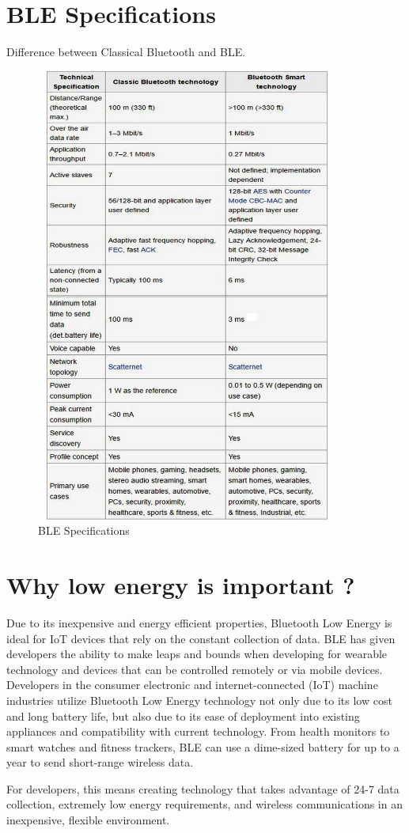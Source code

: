 \documentclass[11pt,a4paper]{article}
\begin{document}
	\section{BLE Specifications}
	Difference between Classical Bluetooth and BLE.
	\begin{figure}[h]
    \centering
    \includegraphics[width=10cm,height=15cm]{table.jpg}
    \caption{BLE Specifications}
    \end{figure}
	
	  \newpage
	\section{Why low energy is important ?}
	{
Due to its inexpensive and energy efficient properties, Bluetooth Low Energy is ideal for IoT devices that rely on the constant collection of data. BLE has given developers the ability to make leaps and bounds when developing for wearable technology and devices that can be controlled remotely or via mobile devices. Developers in the consumer electronic and internet-connected (IoT) machine industries utilize Bluetooth Low Energy technology not only due to its low cost and long battery life, but also due to its ease of deployment into existing appliances and compatibility with current technology. From health monitors to smart watches and fitness trackers, BLE can use a dime-sized battery for up to a year to send short-range wireless data.

For developers, this means creating technology that takes advantage of 24-7 data collection, extremely low energy requirements, and wireless communications in an inexpensive, flexible environment.
	}
	
\end{document}
